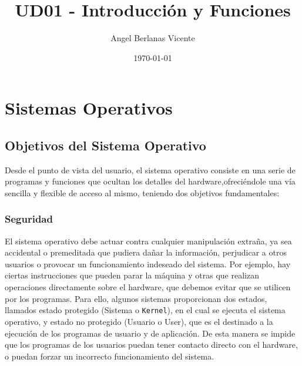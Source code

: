 \documentclass[11pt]{article}
\author{Angel Berlanas Vicente}
\date{\today}
\title{UD01 - Introducción y Funciones}
\begin{document}
\maketitle
\tableofcontents


\section{Sistemas Operativos}
\label{sec:org3485503}
\subsection{Objetivos del Sistema Operativo}
\label{sec:orgccda696}
Desde el punto de vista del usuario, el sistema operativo consiste en
una serie de programas y funciones que ocultan los detalles del
hardware,ofreciéndole una vía sencilla y flexible de acceso al mismo,
teniendo dos objetivos fundamentales:

\subsubsection{Seguridad}
\label{sec:org1b70629}
El sistema operativo debe actuar contra cualquier manipulación extraña,
ya sea accidental o premeditada que pudiera dañar la información,
perjudicar a otros usuarios o provocar un funcionamiento indeseado del
sistema. Por ejemplo, hay ciertas instrucciones que pueden parar la
máquina y otras que realizan operaciones directamente sobre el hardware,
que debemos evitar que se utilicen por los programas. Para ello, algunos
sistemas proporcionan dos estados, llamados estado protegido (Sistema o
\texttt{Kernel}), en el cual se ejecuta el sistema operativo, y estado no
protegido (Usuario o User), que es el destinado a la ejecución de los
programas de usuario y de aplicación. De esta manera se impide que los
programas de los usuarios puedan tener contacto directo con el hardware,
o puedan forzar un incorrecto funcionamiento del sistema.
\end{document}
